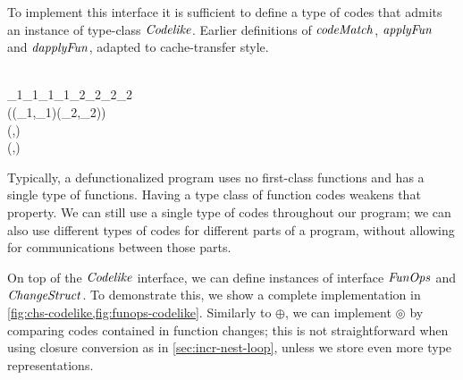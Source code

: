 To implement this interface it is sufficient to define a type of codes that
admits an instance of type-class \ensuremath{\Conid{Codelike}}. Earlier definitions of
\ensuremath{\Varid{codeMatch}}, \ensuremath{\Varid{applyFun}} and \ensuremath{\Varid{dapplyFun}}, adapted to cache-transfer style.
\begin{hscode}\SaveRestoreHook
{}%
%
%
%
\>[B]{}\;\;\;\<[E]%
\\
\>[B]{}\<[3]%
\>[3]{}\mathrel{:\mkern-1mu:}\;_{1}\;_{1}\;_{1}\;_{1}\to {}\;_{2}\;_{2}\;_{2}\;_{2}\to {}\<[E]%
\\
\>[3]{}\<[5]%
\>[5]{}\;((_{1},_{1})\mathrel{:\mkern-1mu\sim\mkern-1mu:}(_{2},_{2})){}\<[E]%
\\
\>[B]{}\<[3]%
\>[3]{}\mathrel{:\mkern-1mu:}\;\;\;\;\to {}\to {}\to (,){}\<[E]%
\\
\>[B]{}\<[3]%
\>[3]{}\mathrel{:\mkern-1mu:}\;\;\;\;\to \Delta {}\to \Delta {}\to {}\to (\Delta {},){}\<[E]%
\ColumnHook
\end{hscode}\resethooks
Typically, a defunctionalized program uses no first-class functions and has a
single type of functions. Having a type class of function codes weakens that
property. We can still use a single type of codes throughout our program; we can
also use different types of codes for different parts of a program, without
allowing for communications between those parts.

On top of the \ensuremath{\Conid{Codelike}} interface, we can define instances of interface \ensuremath{\Conid{FunOps}} and
\ensuremath{\Conid{ChangeStruct}}. To demonstrate this, we show a complete implementation in
\cref{fig:chs-codelike,fig:funops-codelike}.
Similarly to \ensuremath{\oplus }, we can implement \ensuremath{\circledcirc } by comparing codes
contained in function changes; this is not straightforward when using closure
conversion as in \cref{sec:incr-nest-loop}, unless we store even more type
representations.

